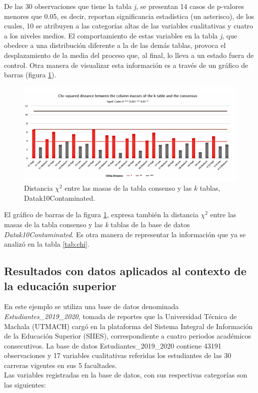 \documentclass[water,article,submit,moreauthors,pdftex]{mdpi}
\begin{document}
De las 30 observaciones que tiene la tabla \emph{j}, se presentan 14
casos de p-valores menores que 0.05, es decir, reportan significancia
estadística (un asterisco), de los cuales, 10 se atribuyen a las
categorías altas de las variables cualitativas y cuatro a los niveles
medios. El comportamiento de estas variables en la tabla \emph{j}, que
obedece a una distribución diferente a la de las demás tablas, provoca
el desplazamiento de la media del proceso que, al final, lo lleva a un
estado fuera de control. Otra manera de visualizar esta información es a
través de un gráfico de barras (figura \ref{fig:chibar}).

\begin{figure}[!ht]



\begin{center}\includegraphics[width=0.9\linewidth,]{chibar} \end{center}

\caption{Distancia $\chi^2$ entre las masas de la tabla consenso y las $k$ tablas, Datak10Contaminated.}

\label{fig:chibar}
\end{figure}

El gráfico de barras de la figura \ref{fig:chibar}, expresa también la
distancia \(\chi^2\) entre las masas de la tabla consenso y las \emph{k}
tablas de la base de datos \emph{Datak10Contaminated}. Es otra manera de
representar la información que ya se analizó en la tabla \ref{tab:chi}.

\hypertarget{resultados-con-datos-aplicados-al-contexto-de-la-educaciuxf3n-superior}{%
\subsection{Resultados con datos aplicados al contexto de la educación
superior}\label{resultados-con-datos-aplicados-al-contexto-de-la-educaciuxf3n-superior}}

En este ejemplo se utiliza una base de datos denominada
\emph{Estudiantes\_2019\_2020}, tomada de reportes que la Universidad
Técnica de Machala (UTMACH) cargó en la plataforma del Sistema Integral
de Información de la Educación Superior (SIIES), correspondiente a
cuatro periodos académicos consecutivos. La base de datos
Estudiantes\_2019\_2020 contiene 43191 observaciones y 17 variables
cualitativas referidas los estudiantes de las 30 carreras vigentes en
sus 5 facultades.\\
Las variables registradas en la base de datos, con sus respectivas
categorías son las siguientes:
\end{document}
